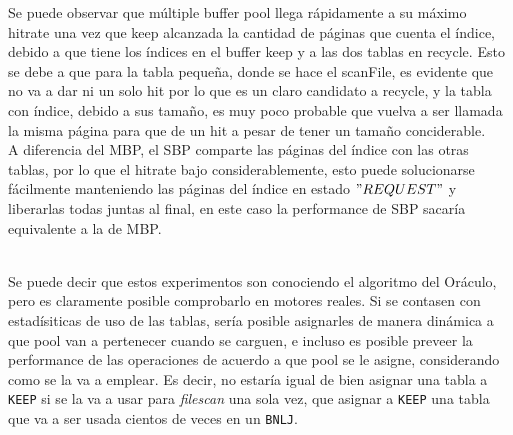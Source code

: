 Se puede observar que múltiple buffer pool llega rápidamente a su máximo hitrate una vez que keep alcanzada
la cantidad de páginas que cuenta el índice, debido a que tiene los índices en el buffer keep 
y a las dos tablas en recycle. Esto se debe a que para la tabla peque\~{n}a, donde se hace el scanFile, 
es evidente que no va a dar ni un solo hit por lo que es un claro candidato a recycle, y la tabla con índice,
 debido a sus tama\~{n}o, es muy poco probable que vuelva a ser llamada la misma página para que de un hit
 a pesar de tener un tama\~{n}o conciderable.\\

A diferencia del MBP, el SBP comparte las páginas del índice con las otras tablas, por lo que el hitrate
bajo considerablemente, esto puede solucionarse fácilmente manteniendo las páginas del índice en estado
$"REQUEST"$ y liberarlas todas juntas al final, en este caso la performance de SBP sacaría equivalente a la de MBP.

\ \\

Se puede decir que estos experimentos son conociendo el algoritmo del Or\'aculo,
pero es claramente posible comprobarlo en motores reales. Si se contasen
con estadísiticas de uso de las tablas, sería posible asignarles de manera
din\'amica a que pool van a pertenecer cuando se carguen, e incluso es
posible preveer la performance de las operaciones de acuerdo a que pool
se le asigne, considerando como se la va a emplear. Es decir, no estaría
igual de bien asignar una tabla a \texttt{KEEP} si se la va a usar para \textit{filescan}
una sola vez, que asignar a \texttt{KEEP} una tabla que va a ser usada cientos de veces
en un \texttt{BNLJ}.
